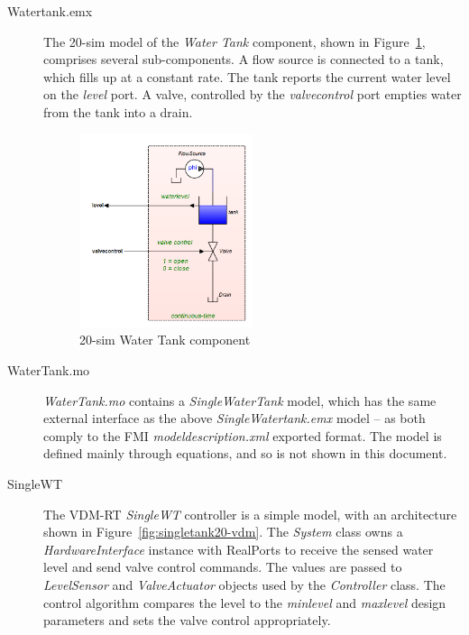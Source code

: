 \begin{description}
\item[Watertank.emx] The 20-sim model of the \emph{Water Tank} component, shown in Figure~\ref{fig:singletank20-sim}, comprises several sub-components. A flow source is connected to a tank, which fills up at a constant rate. The tank reports the current water level on the \emph{level} port. A valve, controlled by the \emph{valvecontrol} port empties water from the tank into a drain.

\begin{figure}[htbp]
\begin{center}
\includegraphics[width=0.5\textwidth]{singletank/20-sim.png}
\caption{20-sim Water Tank component}
\label{fig:singletank20-sim}
\end{center}
\end{figure}

\item[WaterTank.mo] \emph{WaterTank.mo} contains a \emph{SingleWaterTank} model, which has the same external interface as the above \emph{SingleWatertank.emx} model -- as both comply to the FMI \emph{modeldescription.xml} exported format. The model is defined mainly through equations, and so is not shown in this document.
%

\item[SingleWT] The VDM-RT \emph{SingleWT} controller is a simple model, with an architecture shown in Figure~\ref{fig:singletank20-vdm}. The \emph{System} class owns a \emph{HardwareInterface} instance with RealPorts to receive the sensed water level and send valve control commands. The values are passed to \emph{LevelSensor} and \emph{ValveActuator} objects used by the \emph{Controller} class. The control algorithm compares the level to the \emph{minlevel} and \emph{maxlevel} design parameters and sets the valve control appropriately.
 

\end{description}
